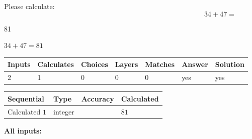 \documentclass[12pt]{article}
\begin{document}
Please calculate:
\begin{equation}
34 +  %
47 = \nonumber
\end{equation}
 
 
 
\noindent{}
 
 

81
 
 
\noindent{}
 
 

 
 
 
\noindent{}
 
 

$ %
34 +  %
47=   %
81$
 
 
\noindent{}
 
 

 
   
   
   
   
\noindent\begin{tabular}{|l|l|l|l|l|l|l|}
 \hline
Inputs & Calculates & Choices & Layers & Matches & Answer & Solution \\ \hline
 2  & 
 1  & 
 0
  & 
 0  & 
 0  & 
  yes & 
  yes 
  \\ \hline
 \end{tabular}
   
   
   
   
\noindent{}
   
   
  
  
\noindent\begin{tabular}{|l|l|l|l|}
\hline
 Sequential & Type & Accuracy & Calculated \\ 
\hline
 
 
  Calculated $  1 $ & integer &  & 
  $ 81 $ 
 \\  \hline  
 \end{tabular}
   
   
   
   
\noindent\vspace{0.1in}\hspace{-0.08in} {\textbf{\Large{All inputs: }}}
   
   
  
\end{document}
